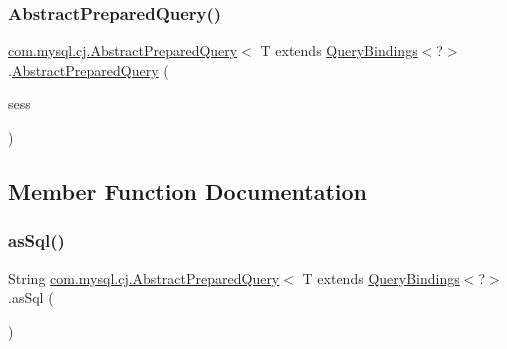 \subsubsection{\texorpdfstring{Abstract\+Prepared\+Query()}{AbstractPreparedQuery()}}
{\footnotesize\ttfamily \mbox{\hyperlink{classcom_1_1mysql_1_1cj_1_1_abstract_prepared_query}{com.\+mysql.\+cj.\+Abstract\+Prepared\+Query}}$<$ T extends \mbox{\hyperlink{interfacecom_1_1mysql_1_1cj_1_1_query_bindings}{Query\+Bindings}}$<$?$>$.\mbox{\hyperlink{classcom_1_1mysql_1_1cj_1_1_abstract_prepared_query}{Abstract\+Prepared\+Query}} (\begin{DoxyParamCaption}\item[{\mbox{\hyperlink{classcom_1_1mysql_1_1cj_1_1_native_session}{Native\+Session}}}]{sess }\end{DoxyParamCaption})}



\subsection{Member Function Documentation}
\mbox{\label{classcom_1_1mysql_1_1cj_1_1_abstract_prepared_query_a8257fe96b601affc2189c6c0739baf72}} 
\subsubsection{\texorpdfstring{as\+Sql()}{asSql()}\hspace{0.1cm}{\footnotesize\ttfamily [1/2]}}
{\footnotesize\ttfamily String \mbox{\hyperlink{classcom_1_1mysql_1_1cj_1_1_abstract_prepared_query}{com.\+mysql.\+cj.\+Abstract\+Prepared\+Query}}$<$ T extends \mbox{\hyperlink{interfacecom_1_1mysql_1_1cj_1_1_query_bindings}{Query\+Bindings}}$<$?$>$.as\+Sql (\begin{DoxyParamCaption}{ }\end{DoxyParamCaption})}

\mbox{\label{classcom_1_1mysql_1_1cj_1_1_abstract_prepared_query_a02bd57c8fd71f3defb3ed96ef37542a5}} 
